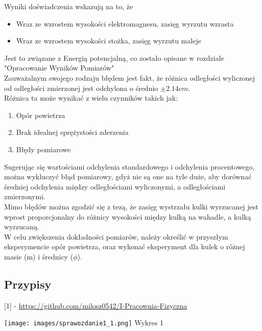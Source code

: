 \documentclass{article}
\begin{document}
{Wyniki doświadczenia wskazują na to, że
\begin{itemize}
    \item Wraz ze wzrostem wysokości elektromagnesu, zasięg wyrzutu wzrasta
    \item Wraz ze wzrostem wysokości stożka, zasięg wyrzutu maleje
\end{itemize}
Jest to związane z Energią potencjalną, co zostało opisane w rozdziale "Opracowanie Wyników Pomiarów" \\
Zauważalnym swojego rodzaju błędem jest fakt, że różnica odległości wyliczonej od odległości zmierzonej jest odchylona o średnio $\pm2.14cm$. \\
Różnica ta może wynikać z wielu czynników takich jak:
\begin{enumerate}
    \item Opór powietrza
    \item Brak idealnej sprężystości zderzenia
    \item Błędy pomiarowe
\end{enumerate}
Sugerując się wartościami odchylenia standardowego i odchylenia procentowego, można wykluczyć błąd pomiarowy, gdyż nie są one na tyle duże, aby dorównać średniej odchylenia między odległościami wyliczonymi, a odległościami zmierzonymi. \\

Mimo błędów można zgodzić się z tezą, że zasięg wystrzału kulki wyrzucanej jest wprost proporcjonalny do różnicy wysokości między kulką na wahadle, a kulką wyrzucaną. \\
W celu zwiększenia dokładności pomiarów, należy określić w przyszłym eksperymencie opór powietrza, oraz wykonać eksperyment dla kulek o różnej masie (m) i średnicy ($\phi$).
}

\subsection*{Przypisy}
{[1] - \href{https://github.com/milosz0542/I-Pracownia-Fizyczna}{https://github.com/milosz0542/I-Pracownia-Fizyczna}}

\pagebreak
\texttt{[image: images/sprawozdanie1\_1.png]}
\footnotesize Wykres 1
\end{document}

